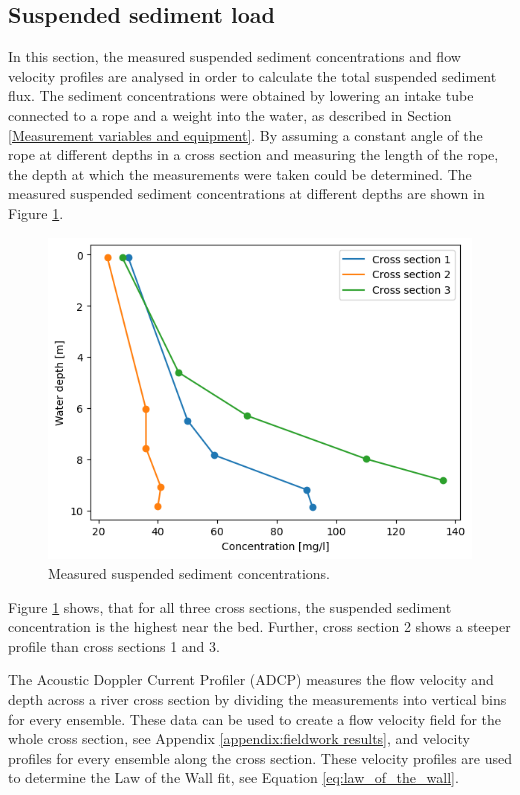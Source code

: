 \subsection{Suspended sediment load}
\label{sec: Suspended sediment load}
In this section, the measured suspended sediment concentrations and flow velocity profiles are analysed in order to calculate the total suspended sediment flux. The sediment concentrations were obtained by lowering an intake tube connected to a rope and a weight into the water, as described in Section \ref{Measurement variables and equipment}. By assuming a constant angle of the rope at different depths in a cross section and measuring the length of the rope, the depth at which the measurements were taken could be determined. The measured suspended sediment concentrations at different depths are shown in Figure \ref{fig:Measured suspended sediment concentrations}.

\begin{figure}[H]
    \centering
    \includegraphics[width=0.75\linewidth]{figures/ch6/Measured_SSC.png}
    \caption{Measured suspended sediment concentrations.}
    \label{fig:Measured suspended sediment concentrations}
\end{figure}

Figure \ref{fig:Measured suspended sediment concentrations} shows, that for all three cross sections, the suspended sediment concentration is the highest near the bed. Further, cross section 2 shows a steeper profile than cross sections 1 and 3.

The Acoustic Doppler Current Profiler (ADCP) measures the flow velocity and depth across a river cross section by dividing the measurements into vertical bins for every ensemble. These data can be used to create a flow velocity field for the whole cross section, see Appendix \ref{appendix:fieldwork results}, and velocity profiles for every ensemble along the cross section. These velocity profiles are used to determine the Law of the Wall fit, see Equation \ref{eq:law_of_the_wall}.

